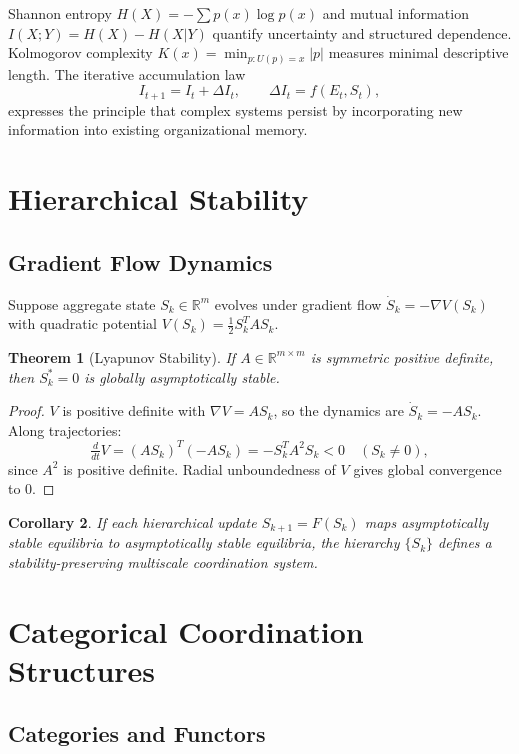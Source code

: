 \documentclass[12pt]{article}
\newtheorem{theorem}{Theorem}[section]
\newtheorem{corollary}[theorem]{Corollary}
\begin{document}
Shannon entropy $H(X) = -\sum p(x)\log p(x)$ and mutual information $I(X;Y) = H(X) - H(X|Y)$ quantify uncertainty and structured dependence. Kolmogorov complexity $K(x) = \min_{p: U(p)=x} |p|$ measures minimal descriptive length. The iterative accumulation law
\[
I_{t+1} = I_t + \Delta I_t, \qquad \Delta I_t = f(E_t, S_t),
\]
expresses the principle that complex systems persist by incorporating new information into existing organizational memory.

\section{Hierarchical Stability}

\subsection{Gradient Flow Dynamics}

Suppose aggregate state $S_k \in \mathbb{R}^m$ evolves under gradient flow $\dot{S}_k = -\nabla V(S_k)$ with quadratic potential $V(S_k) = \tfrac{1}{2} S_k^T A S_k$.

\begin{theorem}[Lyapunov Stability]
If $A \in \mathbb{R}^{m \times m}$ is symmetric positive definite, then $S_k^* = 0$ is globally asymptotically stable.
\end{theorem}

\begin{proof}
$V$ is positive definite with $\nabla V = AS_k$, so the dynamics are $\dot{S}_k = -AS_k$. Along trajectories:
\[
\tfrac{d}{dt}V = (AS_k)^T(-AS_k) = -S_k^T A^2 S_k < 0 \quad (S_k \neq 0),
\]
since $A^2$ is positive definite. Radial unboundedness of $V$ gives global convergence to $0$.
\end{proof}

\begin{corollary}
If each hierarchical update $S_{k+1} = F(S_k)$ maps asymptotically stable equilibria to asymptotically stable equilibria, the hierarchy $\{S_k\}$ defines a stability-preserving multiscale coordination system.
\end{corollary}

\section{Categorical Coordination Structures}

\subsection{Categories and Functors}
\end{document}
